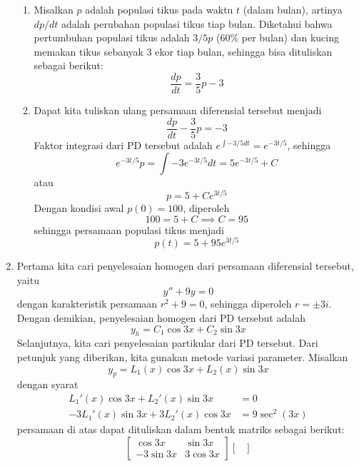 \documentclass[10pt,openany,a4paper]{article}
\begin{document}
\begin{enumerate}
\begin{enumerate}
          \item Misalkan $p$ adalah populasi tikus pada waktu $t$ (dalam bulan), artinya $dp/dt$ adalah perubahan populasi tikus tiap bulan. Diketahui bahwa pertumbuhan populasi tikus adalah $3/5p$ (60\% per bulan) dan kucing memakan tikus sebanyak 3 ekor tiap bulan, sehingga bisa dituliskan sebagai berikut:
                \[
                  \dfrac{dp}{dt} = \frac{3}{5}p - 3
                \]
          \item Dapat kita tuliskan ulang persamaan diferensial tersebut menjadi
                \[
                  \dfrac{dp}{dt} - \frac{3}{5}p = -3
                \]
                Faktor integrasi dari PD tersebut adalah $e^{\int -3/5 dt} = e^{-3t/5}$, sehingga
                \[
                  e^{-3t/5}p = \int -3e^{-3t/5} dt = 5e^{-3t/5} + C
                \]
                atau
                \[
                  p = 5 + Ce^{3t/5}
                \]
                Dengan kondisi awal $p(0) = 100$, diperoleh
                \[
                  100 = 5 + C \implies C = 95
                \]
                sehingga persamaan populasi tikus menjadi
                \[
                  p(t) = 5 + 95e^{3t/5}
                \]
        \end{enumerate}
  \item Pertama kita cari penyelesaian homogen dari persamaan diferensial tersebut, yaitu
        \[
          y'' + 9y = 0
        \]
        dengan karakteristik persamaan $r^2 + 9 = 0$, sehingga diperoleh $r = \pm 3i$. Dengan demikian, penyelesaian homogen dari PD tersebut adalah
        \[
          y_h = C_1 \cos 3x + C_2 \sin 3x
        \]
        Selanjutnya, kita cari penyelesaian partikular dari PD tersebut. Dari petunjuk yang diberikan, kita gunakan metode variasi parameter. Misalkan
        \[
          y_p = L_1(x) \cos 3x + L_2(x) \sin 3x
        \]
        dengan syarat
        \begin{align*}
          L_1'(x) \cos 3x + L_2'(x) \sin 3x    & = 0            \\
          -3L_1'(x) \sin 3x + 3L_2'(x) \cos 3x & = 9 \sec^2(3x)
        \end{align*}
        persamaan di atas dapat dituliskan dalam bentuk matriks sebagai berikut:
        \[
          \begin{bmatrix}
            \cos 3x   & \sin 3x  \\
            -3\sin 3x & 3\cos 3x
          \end{bmatrix}
          \begin{bmatrix}

\end{bmatrix}\]
\end{enumerate}
\end{document}
